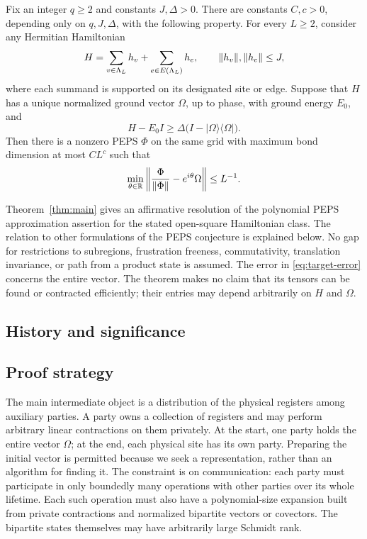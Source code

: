 \begin{theorem}\label{thm:main}
Fix an integer $q\ge2$ and constants $J,\Delta>0$. There are constants
$C,c>0$, depending only on $q,J,\Delta$, with the following property.
For every $L\ge2$, consider any Hermitian Hamiltonian
\begin{equation}\label{eq:model}
 H=\sum_{v\in\Lambda_L}h_v+\sum_{e\in E(\Lambda_L)}h_e,
 \qquad \lVert h_v\rVert,\lVert h_e\rVert\le J,
\end{equation}
where each summand is supported on its designated site or edge.
Suppose that $H$ has a unique normalized ground vector $\Omega$, up to
phase, with ground energy $E_0$, and
\begin{equation}\label{eq:global-gap}
 H-E_0I\ge\Delta\bigl(I-|\Omega\rangle\langle\Omega|\bigr).
\end{equation}
Then there is a nonzero PEPS $\Phi$ on the same grid with maximum bond
dimension at most $CL^c$ such that
\begin{equation}\label{eq:target-error}
 \min_{\theta\in\mathbb R}
 \left\|\frac{\Phi}{\lVert \Phi\rVert}-e^{i\theta}\Omega\right\|
 \le L^{-1}.
\end{equation}
\end{theorem}

Theorem~\ref{thm:main} gives an affirmative resolution of the polynomial
PEPS approximation assertion for the stated open-square Hamiltonian class.
The relation to other formulations of the PEPS conjecture is explained below. No gap for restrictions to subregions,
frustration freeness, commutativity, translation invariance, or path from a
product state is assumed. The error in \eqref{eq:target-error} concerns the
entire vector. The theorem makes no claim that its tensors can be found or
contracted efficiently; their entries may depend arbitrarily on $H$ and
$\Omega$.

\subsection{History and significance}


\subsection{Proof strategy}

The main intermediate object is a distribution of the physical registers
among auxiliary parties. A party owns a collection of registers and may
perform arbitrary linear contractions on them privately. At the start,
one party holds the entire vector $\Omega$; at the end, each physical
site has its own party. Preparing the initial vector is permitted because
we seek a representation, rather than an algorithm for finding it.
The constraint is on communication: each party must participate in only
boundedly many operations with other parties over its whole lifetime.
Each such operation must also have a polynomial-size expansion built from
private contractions and normalized bipartite vectors or covectors. The
bipartite states themselves may have arbitrarily large Schmidt rank.

